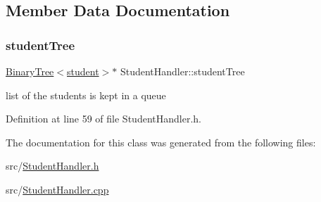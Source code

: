 \subsection{Member Data Documentation}
\mbox{\label{class_student_handler_a7141eccd57a30aa140e5b4e92b0939ea}} 
\subsubsection{\texorpdfstring{student\+Tree}{studentTree}}
{\footnotesize\ttfamily \hyperlink{class_binary_tree}{Binary\+Tree}$<$\hyperlink{classstudent}{student}$>$$\ast$ Student\+Handler\+::student\+Tree\hspace{0.3cm}{\ttfamily [private]}}

list of the students is kept in a queue 

Definition at line 59 of file Student\+Handler.\+h.



The documentation for this class was generated from the following files\+:\begin{DoxyCompactItemize}
\item 
src/\hyperlink{_student_handler_8h}{Student\+Handler.\+h}\item 
src/\hyperlink{_student_handler_8cpp}{Student\+Handler.\+cpp}\end{DoxyCompactItemize}
